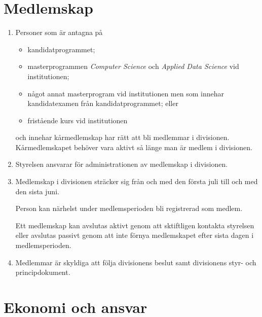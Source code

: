 \documentclass{dvd}
\begin{document}
	\section{Medlemskap}

	\begin{enumerate}[label=\arabic* §, ref=\arabic*]

		\item Personer som är antagna på

		\begin{itemize}
			\item kandidatprogrammet;

			\item masterprogrammen \emph{Computer Science} och \emph{Applied Data Science} vid institutionen;

			\item något annat masterprogram vid institutionen men som innehar kandidatexamen från kandidatprogrammet; eller

			\item fristående kurs vid institutionen
		\end{itemize}

		och innehar kårmedlemskap har rätt att bli medlemmar i divisionen.
		Kårmedlemskapet behöver vara aktivt så länge man är medlem i divisionen.

		\item Styrelsen ansvarar för administrationen av medlemskap i divisionen.

		\item Medlemskap i divisionen sträcker sig från och med den första juli till och med den sista juni.

		Person kan närhelst under medlemsperioden bli registrerad som medlem.

		Ett medlemskap kan avslutas aktivt genom att sktiftligen kontakta styrelsen eller avslutas passivt genom att inte förnya medlemskapet efter sista dagen i medlemsperioden.

		\item Medlemmar är skyldiga att följa divisionens beslut samt divisionens styr- och principdokument.
	\end{enumerate}

	\section{Ekonomi och ansvar}
\end{document}
